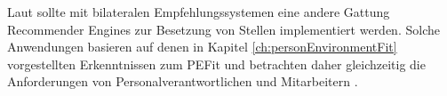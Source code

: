 Laut \textcite[S. 1ff.]{malinowski:2006} sollte mit bilateralen Empfehlungssystemen eine andere Gattung Recommender Engines zur Besetzung von Stellen implementiert werden. Solche Anwendungen basieren auf denen in Kapitel \ref{ch:personEnvironmentFit} vorgestellten Erkenntnissen zum \ac{PEFit} und betrachten daher gleichzeitig die Anforderungen von Personalverantwortlichen und Mitarbeitern \cite[S. 1ff.]{malinowski:2006}.
